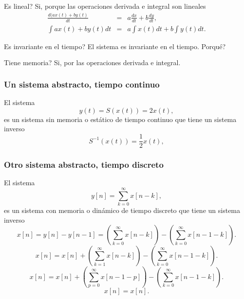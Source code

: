 \textquestiondown Es lineal?  Si, porque las operaciones derivada e
integral son lineales
\begin{eqnarray}
  \frac{d(a x(t) + b y(t)}{dt} &=& a \frac{dx}{dt} + b \frac{dy}{dt},     \\
  \int a x(t) + b y(t) dt &=& a \int x(t) dt + b \int y(t) dt.
\end{eqnarray}

\textquestiondown Es invariante en el tiempo?  El sistema es
invariante en el tiempo. \textquestiondown Porqu\'{e}?

\textquestiondown Tiene memoria?  Si, por las operaciones derivada e
integral.

\subsubsection{Un sistema abstracto, tiempo continuo}

El sistema
\begin{equation}
  y(t)=S\left( x\left( t\right) \right) =2x\left( t\right) ,
\end{equation}
es un sistema sin memoria o est\'{a}tico de tiempo continuo que tiene
un sistema inverso
\begin{equation}
  S^{-1}\left( x\left( t\right) \right) =\frac{1}{2}x(t),
\end{equation}

\subsubsection{Otro sistema abstracto, tiempo discreto}

El sistema
\begin{equation}
  y\left[ n\right] =\sum_{k=0}^{\infty }x[n-k],
\end{equation}
es un sistema con memoria o din\'{a}mico de tiempo discreto que tiene
un sistema inverso
\begin{equation}
  x\left[ n\right] =y\left[ n\right] -y\left[ n-1\right] =
  \left(\sum_{k=0}^{\infty }x[n-k]\right) -\left( \sum_{k=0}^{\infty}x[n-1-k]\right) .
\end{equation}
\begin{equation}
  x\left[ n\right] =
  x[n]+\left( \sum_{k=1}^{\infty }x[n-k]\right) -\left(\sum_{k=0}^{\infty }x[n-1-k]\right) .
\end{equation}
\begin{equation}
  x\left[ n\right] =
  x[n]+\left( \sum_{p=0}^{\infty }x[n-1-p]\right) -\left(\sum_{k=0}^{\infty }x[n-1-k]\right) .
\end{equation}
\begin{equation}
  x\left[ n\right] =x[n].
\end{equation}

